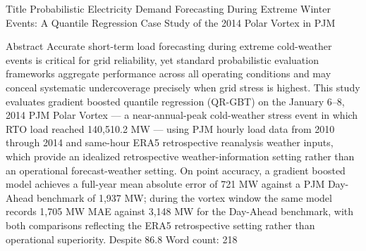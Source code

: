 Title
Probabilistic Electricity Demand Forecasting During Extreme Winter Events: A Quantile Regression Case Study of the 2014 Polar Vortex in PJM

Abstract
Accurate short-term load forecasting during extreme cold-weather events is critical for grid reliability, yet standard probabilistic evaluation frameworks aggregate performance across all operating conditions and may conceal systematic undercoverage precisely when grid stress is highest. This study evaluates gradient boosted quantile regression (QR-GBT) on the January 6–8, 2014 PJM Polar Vortex — a near-annual-peak cold-weather stress event in which RTO load reached 140,510.2 MW — using PJM hourly load data from 2010 through 2014 and same-hour ERA5 retrospective reanalysis weather inputs, which provide an idealized retrospective weather-information setting rather than an operational forecast-weather setting. On point accuracy, a gradient boosted model achieves a full-year mean absolute error of 721 MW against a PJM Day-Ahead benchmark of 1,937 MW; during the vortex window the same model records 1,705 MW MAE against 3,148 MW for the Day-Ahead benchmark, with both comparisons reflecting the ERA5 retrospective setting rather than operational superiority. Despite 86.8%
Word count: 218

